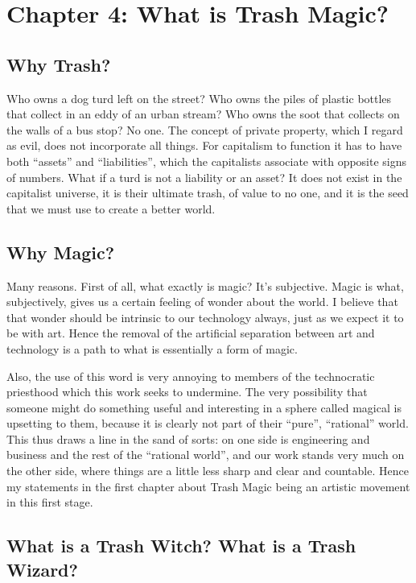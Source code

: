 \section{Chapter 4: What is Trash
Magic?}\label{chapter-4-what-is-trash-magic}

\subsection{Why Trash?}\label{why-trash}

Who owns a dog turd left on the street? Who owns the piles of plastic
bottles that collect in an eddy of an urban stream? Who owns the soot
that collects on the walls of a bus stop? No one. The concept of private
property, which I regard as evil, does not incorporate all things. For
capitalism to function it has to have both ``assets'' and
``liabilities'', which the capitalists associate with opposite signs of
numbers. What if a turd is not a liability or an asset? It does not
exist in the capitalist universe, it is their ultimate trash, of value
to no one, and it is the seed that we must use to create a better world.

\subsection{Why Magic?}\label{why-magic}

Many reasons. First of all, what exactly is magic? It's subjective.
Magic is what, subjectively, gives us a certain feeling of wonder about
the world. I believe that that wonder should be intrinsic to our
technology always, just as we expect it to be with art. Hence the
removal of the artificial separation between art and technology is a
path to what is essentially a form of magic.

Also, the use of this word is very annoying to members of the
technocratic priesthood which this work seeks to undermine. The very
possibility that someone might do something useful and interesting in a
sphere called magical is upsetting to them, because it is clearly not
part of their ``pure'', ``rational'' world. This thus draws a line in
the sand of sorts: on one side is engineering and business and the rest
of the ``rational world'', and our work stands very much on the other
side, where things are a little less sharp and clear and countable.
Hence my statements in the first chapter about Trash Magic being an
artistic movement in this first stage.

\subsection{What is a Trash Witch? What is a Trash
Wizard?}\label{what-is-a-trash-witch-what-is-a-trash-wizard}

